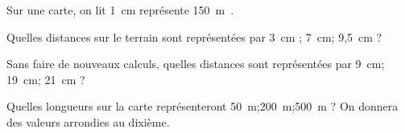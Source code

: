 \begin{myenumerate}
  \item Sur une carte, on lit \og{}1~cm représente 150~m\fg\ .
\par Quelles distances sur le terrain sont représentées par 3~cm ; 7~cm; 9,5~cm ?
\item Sans faire de nouveaux calculs, quelles distances sont représentées par 9~cm; 19~cm; 21~cm ?
\item Quelles longueurs sur la carte représenteront 50~m;200~m;500~m ? On donnera des valeurs arrondies au dixième.
\end{myenumerate}